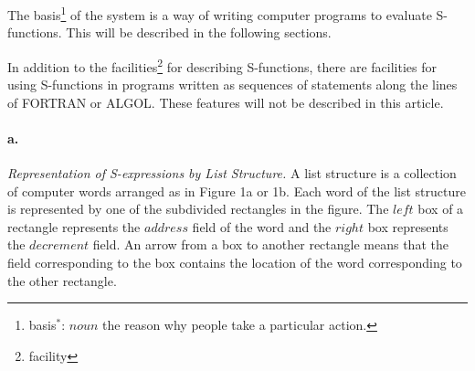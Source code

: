 \documentclass[11pt, a4paper]{article}
\begin{document}
The
basis\footnote{basis$^*$: $noun$ the reason why people take a particular
  action.}
of the system is a way of writing computer programs to evaluate
S-functions. This will be described in the following sections.

In addition to the
facilities\footnote{facility}
for describing S-functions, there are facilities
for using S-functions in programs written as sequences of statements along the
lines of FORTRAN or ALGOL. These features will not be described in this
article.

\paragraph{a.}\textit{Representation of S-expressions by List Structure.}
A list structure is a collection of computer words arranged as in Figure 1a or
1b. Each word of the list structure is represented by one of the subdivided
rectangles in the figure. The $left$ box of a rectangle represents the $address$
field of the word and the $right$ box represents the $decrement$ field. An arrow
from a box to another rectangle means that the field corresponding to the box
contains the location of the word corresponding to the other rectangle.
\end{document}
